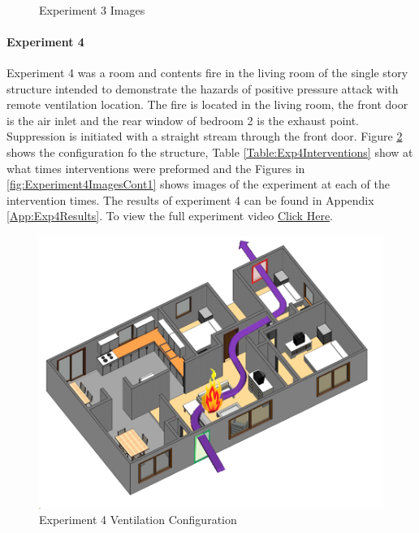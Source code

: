 \documentclass{article}
\begin{document}
\begin{figure}[H]
	\ContinuedFloat 
	\centering 
	 \ 
	\caption{Experiment 3 Images}
	\label{fig:Experiment3ImagesCont3} 
\end{figure}

\paragraph{Experiment 4}\mbox{}

Experiment 4 was a room and contents fire in the living room of the single story structure intended to demonstrate the hazards of positive pressure attack with remote ventilation location. The fire is located in the living room, the front door is the air inlet and the rear window of bedroom 2 is the exhaust point. Suppression is initiated with a straight stream through the front door. Figure \ref{fig:Exp4VentConfig} shows the configuration fo the structure, Table \ref{Table:Exp4Interventions} show at what times interventions were preformed and the Figures in \ref{fig:Experiment4ImagesCont1} shows images of the experiment at each of the intervention times. The results of experiment 4 can be found in Appendix \ref{App:Exp4Results}. To view the full experiment video \href{https://youtu.be/RPpYMvXUp}{Click Here}.

\begin{figure}[H]
	\centering
	\includegraphics[width=5in]{0_Images/FireExperiments/Single_Story/Experiment_4.jpg}
	\caption{Experiment 4 Ventilation Configuration}
	\label{fig:Exp4VentConfig}
\end{figure}
\end{document}
